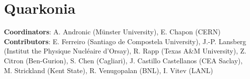 \documentclass[../report.tex]{subfiles}
\begin{document}
\section{Quarkonia}

\label{sec:quarkonia}

\textbf{Coordinators}: A. Andronic (M\"{u}nster University), E. Chapon (CERN)
\linebreak
\textbf{Contributors}: 
E. Ferreiro (Santiago de Compostela University), J.-P. Lansberg (Institut the Physique Nucl\'{e}aire d'Orsay), R. Rapp (Texas A\&M University),
Z. Citron (Ben-Gurion), S. Chen (Cagliari),
J. Castillo Castellanos (CEA Saclay), 
M. Strickland (Kent State), R. Venugopalan (BNL), I. Vitev (LANL)


\end{document}
